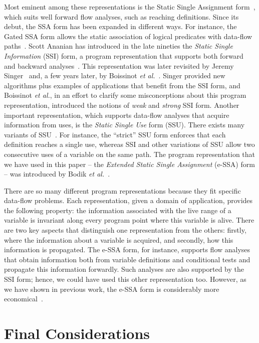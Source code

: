 \documentclass[preprint]{elsarticle}
\begin{document}
Most eminent among these representations is the Static Single Assignment
form~\cite{Cytron91}, which suits well forward flow analyses, such as reaching
definitions.
Since its debut, the SSA form has been expanded in different ways.
For instance, the Gated SSA form allows the static association of logical
predicates with data-flow paths~\cite{Ottenstein90,Tu95}.
Scott Ananian has introduced in the late nineties the {\em Static Single
Information} (SSI) form, a program representation that supports both forward and
backward analyses~\cite{Ananian99}.
This representation was later revisited by Jeremy Singer~\cite{Singer06} and,
a few years later, by Boissinot {\em et al.}~\cite{Benoit09}.
Singer provided new algorithms plus examples of applications that benefit from
the SSI form, and Boissinot {\em et al.}, in an effort to clarify some
misconceptions about this program representation, introduced the notions of
{\em weak} and {\em strong} SSI form.
Another important representation, which supports data-flow analyses that
acquire information from uses, is the \emph{Static Single Use} form (SSU).
There exists many variants of
SSU~\cite{Plevyak96,George03,Lo98}.
For instance, the ``strict'' SSU form enforces that each definition reaches a
single use, whereas SSI and other variations of SSU allow two consecutive uses
of a variable on the same path.
The program representation that we have used in this paper -- the {\em Extended
Static Single Assignment} (e-SSA) form -- was introduced by Bodik
{\em et al.}~\cite{Bodik00}.

There are so many different program representations because they fit specific
data-flow problems.
Each representation, given a domain of application, provides the following
property: the information associated with the live range of a variable is
invariant along every program point where this variable is alive.
There are two key aspects that distinguish one representation from the others:
firstly, where the information about a variable is acquired, and secondly,
how this information is propagated.
The e-SSA form, for instance, supports flow analyses that obtain information
both from variable definitions and conditional tests and propagate this
information forwardly.
Such analyses are also supported by the SSI form; hence, we could have used this
other representation too.
However, as we have shown in previous work, the e-SSA form is considerably
more economical~\cite{Tavares11b}.

\section{Final Considerations}
\label{sec:con}
\end{document}
